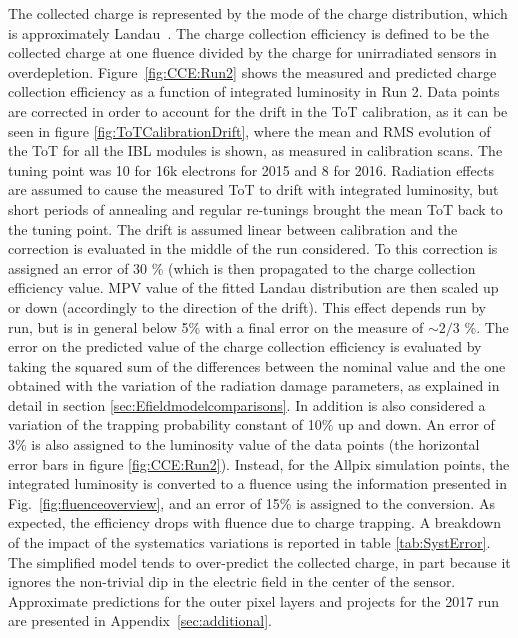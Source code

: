 The collected charge is represented by the mode of the charge distribution, which is approximately Landau~\cite{Landau:1944if}.  The charge collection efficiency is defined to be the collected charge at one fluence divided by the charge for unirradiated sensors in overdepletion.  Figure~\ref{fig:CCE:Run2} shows the measured and predicted charge collection efficiency as a function of integrated luminosity in Run 2. Data points are corrected in order to account for the drift in the ToT calibration, as it can be seen in figure \ref{fig:ToTCalibrationDrift}, where the mean and RMS evolution of the ToT for all the IBL modules is shown, as measured in calibration scans. The tuning point was 10  for 16k electrons for 2015 and 8 for 2016. Radiation effects are assumed to cause the measured ToT to drift  with integrated luminosity, but short periods of annealing and regular re-tunings brought the mean ToT back to the tuning point. The drift is assumed linear between calibration and the correction is evaluated in the middle of the run considered. To this correction is assigned an error of 30 \% (which is then propagated to the charge collection efficiency value. MPV value of the fitted Landau distribution are then scaled up or down (accordingly to the direction of the drift). This effect depends run by run, but is in general below 5\% with a final error on the measure of $\sim 2/3 $ \%. The error on the predicted value of the charge collection efficiency is evaluated by taking the squared sum of the differences between the nominal value and the one obtained with the variation of the radiation damage parameters, as explained in detail in section \ref{sec:Efieldmodelcomparisons}. In addition is also considered a variation of the trapping probability constant of 10\% up and down. An error of 3\% is also assigned to the luminosity value of the data points (the horizontal error bars in figure \ref{fig:CCE:Run2}). Instead, for the Allpix simulation points, the integrated luminosity is converted to a fluence using the information presented in Fig.~\ref{fig:fluenceoverview}, and an error of 15\% is assigned to the conversion. As expected, the efficiency drops with fluence due to charge trapping.  A breakdown of the impact of the systematics variations is reported in table \ref{tab:SystError}. The simplified model tends to over-predict the collected charge, in part because it ignores the non-trivial dip in the electric field in the center of the sensor.   Approximate predictions for the outer pixel layers and projects for the 2017 run are presented in Appendix~\ref{sec:additional}.

